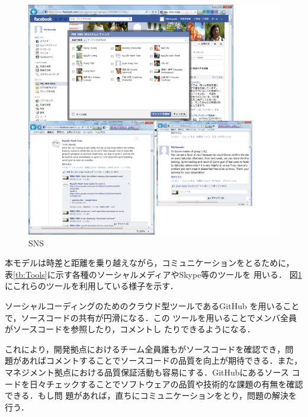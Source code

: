 \documentclass[a4j, 12Q, twocolumn, twoside]{jsarticle}
\begin{document}
\begin{figure}
  \begin{center}
   \includegraphics[width=\columnwidth]{./figures/SNS.png}
   \caption{SNS}
   \label{fig:SNS}
  \end{center}
\end{figure}


本モデルは時差と距離を乗り越えながら，コミュニケーションをとるために，
表\ref{tb:Tools}に示す各種のソーシャルメディアやSkype等のツールを
用いる．
図\ref{fig:SNS}
にこれらのツールを利用している様子を示す．

ソーシャルコーディングのためのクラウド型ツールであるGitHub
を用いることで，ソースコードの共有が円滑になる．この
ツールを用いることでメンバ全員がソースコードを参照したり，コメントし
たりできるようになる．

これにより，開発拠点におけるチーム全員誰もがソースコードを確認でき，問
題があればコメントすることでソースコードの品質を向上が期待できる．また，
マネジメント拠点における品質保証活動も容易にする．GitHubにあるソース
コードを日々チェックすることでソフトウェアの品質や技術的な課題の有無を確認できる．もし問
題があれば，直ちにコミュニケーションをとり，問題の解決を行う．
\end{document}
